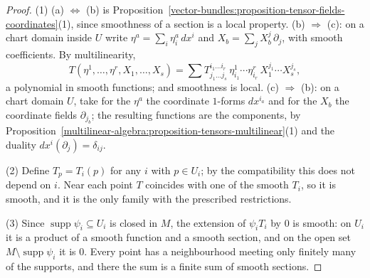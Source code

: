 \begin{proof}
(1) (a) $\Leftrightarrow$ (b) is Proposition~\ref{vector-bundles:proposition-tensor-fields-coordinates}(1), since smoothness of a section is a local property. (b) $\Rightarrow$ (c): on a chart domain inside $U$
write $\eta^a = \sum_i\eta^a_i\,dx^i$ and $X_b = \sum_jX_b^j\,\partial_j$, with smooth coefficients. By multilinearity,
\[
T(\eta^1, \ldots, \eta^r, X_1, \ldots, X_s) = \sum T^{i_1 \ldots i_r}_{j_1 \ldots j_s}\,\eta^1_{i_1} \cdots \eta^r_{i_r}\,X_1^{j_1} \cdots X_s^{j_s},
\]
a polynomial in smooth functions; and smoothness is local. (c) $\Rightarrow$ (b): on a chart domain $U$, take for the $\eta^a$ the coordinate $1$-forms $dx^{i_a}$ and for the $X_b$ the coordinate fields $\partial_{j_b}$; the
resulting functions are the components, by Proposition~\ref{multilinear-algebra:proposition-tensors-multilinear}(1) and the duality $dx^i(\partial_j) = \delta_{ij}$.

(2) Define $T_p = T_i(p)$ for any $i$ with $p \in U_i$; by the compatibility this does not depend on $i$. Near each point $T$ coincides with one of the smooth $T_i$, so it is smooth, and it is the only family with the
prescribed restrictions.

(3) Since $\operatorname{supp}\psi_i \subseteq U_i$ is closed in $M$, the extension of $\psi_iT_i$ by $0$ is smooth: on $U_i$ it is a product of a smooth function and a smooth section, and on the open set
$M \setminus \operatorname{supp}\psi_i$ it is $0$. Every point has a neighbourhood meeting only finitely many of the supports, and there the sum is a finite sum of smooth sections.
\end{proof}

